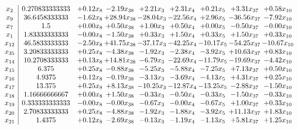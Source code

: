 \documentclass[8pt]{article}
\begin{document}
\[\begin{array}{c| c c@{\hskip 2pt} c@{\hskip 2pt} c@{\hskip 2pt} c@{\hskip 2pt} c@{\hskip 2pt} c@{\hskip 2pt} c@{\hskip 2pt} }
 x_{2}   &  0.270833333333 & +  0.12 x_{8} & -2.19 x_{38} & +  2.21 x_{3} & +  2.31 x_{4} & +  0.21 x_{5} & +  3.31 x_{37} & +  0.58 x_{10}\\
 x_{9}   &  36.6458333333 & -1.62 x_{8} & + 28.94 x_{38} & -28.04 x_{3} & -22.56 x_{4} & +  2.96 x_{5} & -36.56 x_{37} & -7.92 x_{10}\\
 x_{7}   &  1.5 & +  0.00 x_{8} & +  0.50 x_{38} & +  1.00 x_{3} & +  0.50 x_{4} & +  0.00 x_{5} & -0.50 x_{37} & -0.00 x_{10}\\
 x_{1}   &  1.83333333333 & -0.00 x_{8} & -1.50 x_{38} & +  0.33 x_{3} & +  1.50 x_{4} & +  0.33 x_{5} & +  1.50 x_{37} & +  0.33 x_{10}\\
 x_{12}   &  46.5833333333 & -2.50 x_{8} & + 41.75 x_{38} & -37.17 x_{3} & -42.25 x_{4} & -10.17 x_{5} & -54.25 x_{37} & -10.67 x_{10}\\
 x_{35}   &  3.20833333333 & +  0.25 x_{8} & -4.38 x_{38} & -1.92 x_{3} & -2.38 x_{4} & -3.92 x_{5} & + 10.63 x_{37} & +  0.83 x_{10}\\
 x_{14}   &  10.2708333333 & +  0.13 x_{8} & + 14.81 x_{38} & -6.79 x_{3} & -22.69 x_{4} & -11.79 x_{5} & -19.69 x_{37} & -4.42 x_{10}\\
 x_{15}   &  6.375 & +  0.25 x_{8} & -0.88 x_{38} & -5.25 x_{3} & -5.88 x_{4} & -7.25 x_{5} & +  7.13 x_{37} & +  0.50 x_{10}\\
 x_{16}   &  4.9375 & +  0.12 x_{8} & -0.19 x_{38} & -3.13 x_{3} & -3.69 x_{4} & -4.13 x_{5} & +  4.31 x_{37} & +  0.25 x_{10}\\
 x_{17}   &  13.375 & +  0.25 x_{8} & +  8.13 x_{38} & -10.25 x_{3} & -12.87 x_{4} & -13.25 x_{5} & -2.88 x_{37} & -1.50 x_{10}\\
 x_{18}   &  1.16666666667 & +  0.00 x_{8} & +  1.50 x_{38} & -0.33 x_{3} & -0.50 x_{4} & -0.33 x_{5} & -1.50 x_{37} & -0.33 x_{10}\\
 x_{19}   &  0.333333333333 & -0.00 x_{8} & -0.00 x_{38} & -0.67 x_{3} & -0.00 x_{4} & -0.67 x_{5} & +  1.00 x_{37} & +  0.33 x_{10}\\
 x_{20}   &  2.70833333333 & +  0.25 x_{8} & -4.88 x_{38} & -1.92 x_{3} & -1.88 x_{4} & -3.92 x_{5} & + 11.13 x_{37} & +  1.83 x_{10}\\
 x_{21}   &  1.4375 & +  0.12 x_{8} & -2.69 x_{38} & -0.13 x_{3} & -1.19 x_{4} & -1.13 x_{5} & +  5.81 x_{37} & +  1.25 x_{10}\\

\end{array}\]
\end{document}
